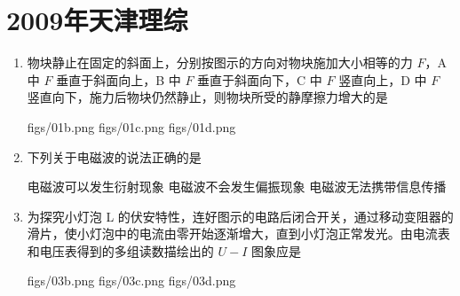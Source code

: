 \documentclass[\gkver]{gaokaozhenti}
\begin{document}
\chapter{2009年天津理综}

\begin{enumerate}
\item
物块静止在固定的斜面上，分别按图示的方向对物块施加大小相等的力 $F$，A 中 $F$ 垂直于斜面向上，B 中 $F$ 垂直于斜面向下，C 中 $F$ 竖直向上，D 中 $F$ 竖直向下，施力后物块仍然静止，则物块所受的静摩擦力增大的是

{figs/01b.png}
{figs/01c.png}
{figs/01d.png}


\item
下列关于电磁波的说法正确的是

{电磁波可以发生衍射现象}
{电磁波不会发生偏振现象}
{电磁波无法携带信息传播}


\item
为探究小灯泡 L 的伏安特性，连好图示的电路后闭合开关，通过移动变阻器的滑片，使小灯泡中的电流由零开始逐渐增大，直到小灯泡正常发光。由电流表和电压表得到的多组读数描绘出的 $U-I$ 图象应是


{figs/03b.png}
{figs/03c.png}
{figs/03d.png}


\end{enumerate}
\end{document}
